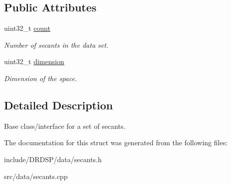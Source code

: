 \subsection*{Public Attributes}
\begin{DoxyCompactItemize}
\item 
\hypertarget{struct_d_r_d_s_p_1_1_secants_a0c6a707afa517ee01f1a2a76e1ed76bf}{uint32\-\_\-t \hyperlink{struct_d_r_d_s_p_1_1_secants_a0c6a707afa517ee01f1a2a76e1ed76bf}{count}}\label{struct_d_r_d_s_p_1_1_secants_a0c6a707afa517ee01f1a2a76e1ed76bf}

\begin{DoxyCompactList}\small\item\em Number of secants in the data set. \end{DoxyCompactList}\item 
\hypertarget{struct_d_r_d_s_p_1_1_secants_a950d625f7d298f93eaad20062f79db1b}{uint32\-\_\-t \hyperlink{struct_d_r_d_s_p_1_1_secants_a950d625f7d298f93eaad20062f79db1b}{dimension}}\label{struct_d_r_d_s_p_1_1_secants_a950d625f7d298f93eaad20062f79db1b}

\begin{DoxyCompactList}\small\item\em Dimension of the space. \end{DoxyCompactList}\end{DoxyCompactItemize}


\subsection{Detailed Description}
Base class/interface for a set of secants. 

The documentation for this struct was generated from the following files\-:\begin{DoxyCompactItemize}
\item 
include/\-D\-R\-D\-S\-P/data/secants.\-h\item 
src/data/secants.\-cpp\end{DoxyCompactItemize}
